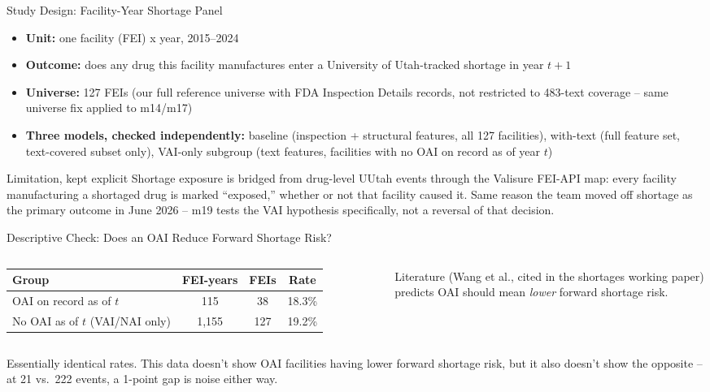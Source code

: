 \documentclass[aspectratio=169,10pt]{beamer}
\begin{document}
\begin{frame}{Study Design: Facility-Year Shortage Panel}
\begin{itemize}
  \setlength{\itemsep}{8pt}
  \item \textbf{Unit:} one facility (FEI) x year, 2015--2024
  \item \textbf{Outcome:} does any drug this facility manufactures enter a University of
        Utah-tracked shortage in year $t{+}1$
  \item \textbf{Universe:} 127 FEIs (our full reference universe with FDA Inspection Details
        records, not restricted to 483-text coverage -- same universe fix applied to m14/m17)
  \item \textbf{Three models, checked independently:} baseline (inspection + structural
        features, all 127 facilities), with-text (full feature set, text-covered subset only),
        VAI-only subgroup (text features, facilities with no OAI on record as of year $t$)
\end{itemize}
\vspace{8pt}
\begin{alertblock}{Limitation, kept explicit}
\small Shortage exposure is bridged from drug-level UUtah events through the Valisure
FEI-API map: every facility manufacturing a shortaged drug is marked ``exposed,'' whether or
not that facility caused it. Same reason the team moved off shortage as the primary outcome
in June 2026 -- m19 tests the VAI hypothesis specifically, not a reversal of that decision.
\end{alertblock}
\end{frame}

\begin{frame}{Descriptive Check: Does an OAI Reduce Forward Shortage Risk?}
\begin{columns}[T]
{\small
\begin{tabular}{lccc}
\toprule
Group & FEI-years & FEIs & Rate \\
\midrule
OAI on record as of $t$ & 115 & 38 & 18.3\% \\
\rowcolor{lightGray}
No OAI as of $t$ (VAI/NAI only) & 1{,}155 & 127 & 19.2\% \\
\bottomrule
\end{tabular}
}
{\small Literature (Wang et al., cited in the shortages working paper) predicts OAI should
mean \emph{lower} forward shortage risk.}
\end{columns}
\vspace{10pt}
Essentially identical rates. This data doesn't show OAI facilities having lower forward
shortage risk, but it also doesn't show the opposite -- at 21 vs.\ 222 events, a 1-point gap
is noise either way.
\end{frame}
\end{document}
